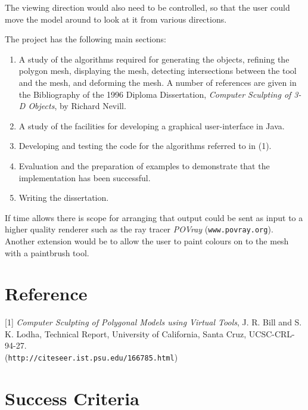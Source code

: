 \documentclass[12pt]{article}
\begin{document}
The viewing direction would also need to be controlled, so that the
user could move the model around to look at it from various directions.

The project has the following main sections:

\begin{enumerate}

\item A study of the algorithms required for generating the objects,
  refining the polygon mesh, displaying the mesh, detecting
  intersections between the tool and the mesh, and deforming the mesh.
  A number of references are given in the Bibliography of the 1996
  Diploma Dissertation, \emph{Computer Sculpting of 3-D Objects}, by
  Richard Nevill.

\item A study of the facilities for developing a graphical
user-interface in Java.

\item Developing and testing the code for the algorithms
referred to in (1).

\item Evaluation and the preparation of examples to demonstrate
that the implementation has been successful.

\item Writing the dissertation.

\end{enumerate}

If time allows there is scope for arranging that output could be sent
as input to a higher quality renderer such as the ray tracer
\emph{POVray} ({\tt www.povray.org}).  Another extension would be to
allow the user to paint colours on to the mesh with a paintbrush tool.


\section*{Reference}

\begin{description}
\item {[1]} \emph{Computer Sculpting of Polygonal Models using Virtual
Tools}, J. R. Bill and S. K. Lodha, Technical Report, University of
California, Santa Cruz, UCSC-CRL-94-27.\\
({\tt http://citeseer.ist.psu.edu/166785.html})
\end{description}


\section*{Success Criteria}
\end{document}
